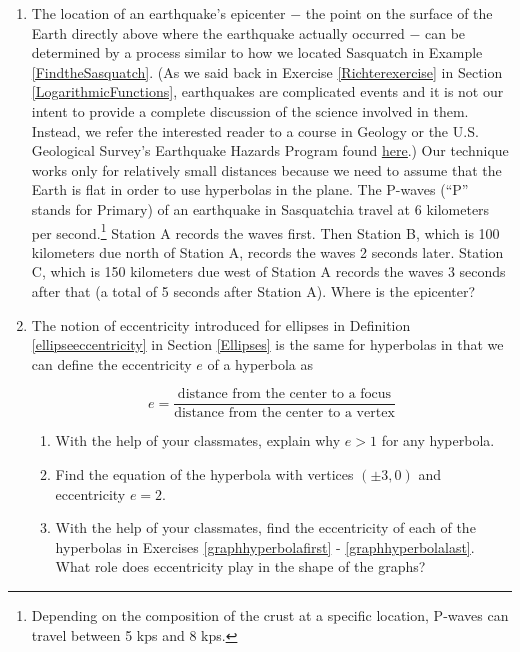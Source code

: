\begin{enumerate}

\setcounter{enumi}{\value{HW}}



\item The location of an earthquake's epicenter $-$ the point on the surface of the Earth directly above where the earthquake actually occurred $-$ can be determined by a process similar to how we located Sasquatch in Example \ref{FindtheSasquatch}.  (As we said back in Exercise \ref{Richterexercise} in Section \ref{LogarithmicFunctions}, earthquakes are complicated events and it is not our intent to provide a complete discussion of the science involved in them.  Instead, we refer the interested reader to a course in Geology or the U.S. Geological Survey's Earthquake Hazards Program found \href{http://earthquake.usgs.gov/}{\underline{here}}.)  Our technique works only for relatively small distances because we need to assume that the Earth is flat in order to use hyperbolas in the plane.  The P-waves (``P'' stands for Primary) of an earthquake in Sasquatchia travel at 6 kilometers per second.\footnote{Depending on the composition of the crust at a specific location, P-waves can travel between 5 kps and 8 kps.}  Station A records the waves first. Then Station B, which is 100 kilometers due north of Station A, records the waves 2 seconds later.  Station C, which is 150 kilometers due west of Station A records the waves 3 seconds after that (a total of 5 seconds after Station A). Where is the epicenter?

\item \label{hyperbolaeccentricity} The notion of eccentricity introduced for ellipses in Definition \ref{ellipseeccentricity} in Section \ref{Ellipses} is the same for hyperbolas in that we can define the eccentricity $e$ of a hyperbola as 

\[  e = \dfrac{\mbox{distance from the center to a focus}}{\mbox{distance from the center to a vertex}} \]
  

\begin{enumerate}

\item  With the help of your classmates, explain why $e > 1$ for any hyperbola.

\item  Find the equation of the hyperbola with vertices $(\pm 3,0)$ and eccentricity $e = 2$.

\item  With the help of your classmates, find the eccentricity of each of the hyperbolas in  Exercises \ref{graphhyperbolafirst} - \ref{graphhyperbolalast}.  What role does eccentricity play in the shape of the graphs?


\end{enumerate}
\end{enumerate}
